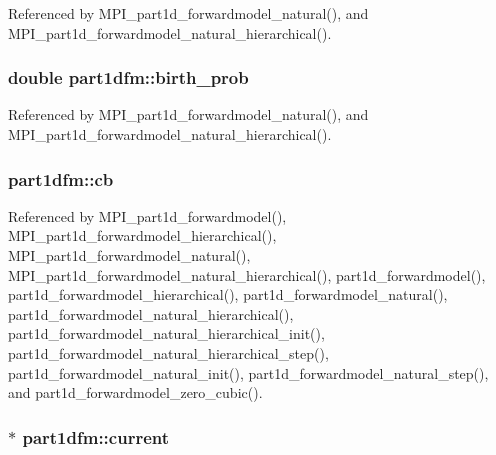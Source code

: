 Referenced by M\+P\+I\+\_\+part1d\+\_\+forwardmodel\+\_\+natural(), and M\+P\+I\+\_\+part1d\+\_\+forwardmodel\+\_\+natural\+\_\+hierarchical().

\subsubsection[{\texorpdfstring{birth\+\_\+prob}{birth_prob}}]{\setlength{\rightskip}{0pt plus 5cm}double part1dfm\+::birth\+\_\+prob}\hypertarget{structpart1dfm_a66f33b2ec190d2e63820929f069cd658}{}\label{structpart1dfm_a66f33b2ec190d2e63820929f069cd658}


Referenced by M\+P\+I\+\_\+part1d\+\_\+forwardmodel\+\_\+natural(), and M\+P\+I\+\_\+part1d\+\_\+forwardmodel\+\_\+natural\+\_\+hierarchical().

\subsubsection[{\texorpdfstring{cb}{cb}}]{ part1dfm\+::cb}\hypertarget{structpart1dfm_a8cfbc803c3312c6eb1d8f2a1da847bb6}{}\label{structpart1dfm_a8cfbc803c3312c6eb1d8f2a1da847bb6}


Referenced by M\+P\+I\+\_\+part1d\+\_\+forwardmodel(), M\+P\+I\+\_\+part1d\+\_\+forwardmodel\+\_\+hierarchical(), M\+P\+I\+\_\+part1d\+\_\+forwardmodel\+\_\+natural(), M\+P\+I\+\_\+part1d\+\_\+forwardmodel\+\_\+natural\+\_\+hierarchical(), part1d\+\_\+forwardmodel(), part1d\+\_\+forwardmodel\+\_\+hierarchical(), part1d\+\_\+forwardmodel\+\_\+natural(), part1d\+\_\+forwardmodel\+\_\+natural\+\_\+hierarchical(), part1d\+\_\+forwardmodel\+\_\+natural\+\_\+hierarchical\+\_\+init(), part1d\+\_\+forwardmodel\+\_\+natural\+\_\+hierarchical\+\_\+step(), part1d\+\_\+forwardmodel\+\_\+natural\+\_\+init(), part1d\+\_\+forwardmodel\+\_\+natural\+\_\+step(), and part1d\+\_\+forwardmodel\+\_\+zero\+\_\+cubic().

\subsubsection[{\texorpdfstring{current}{current}}]{ $\ast$ part1dfm\+::current}\hypertarget{structpart1dfm_ae8bf0f9687de2ce288255f721b688f99}{}\label{structpart1dfm_ae8bf0f9687de2ce288255f721b688f99}


